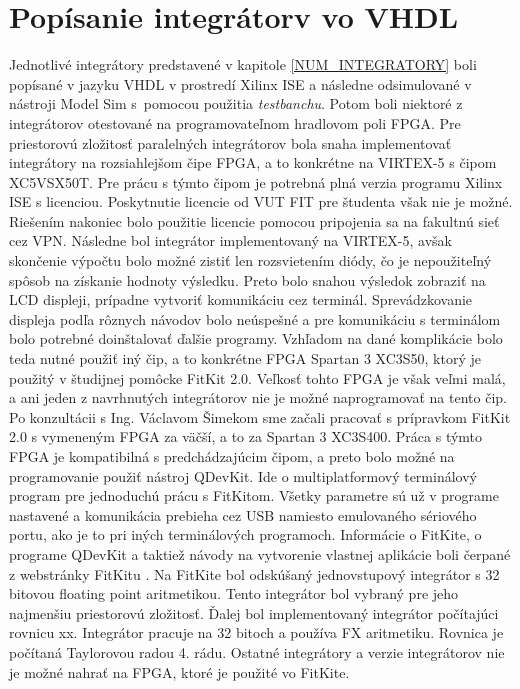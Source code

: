 \chapter{Popísanie integrátorv vo VHDL}
Jednotlivé integrátory predstavené v kapitole \ref{NUM_INTEGRATORY} boli popísané v jazyku VHDL v prostredí Xilinx ISE a následne odsimulované v nástroji Model Sim s pomocou použitia \textit{testbanchu}. Potom boli niektoré z integrátorov otestované na programovateľnom hradlovom poli FPGA.
Pre priestorovú zložitosť paralelných integrátorov bola snaha implementovať integrátory na rozsiahlejšom čipe FPGA, a to konkrétne na VIRTEX-5 s čipom XC5VSX50T. Pre prácu s týmto čipom je potrebná plná verzia programu Xilinx ISE s licenciou. Poskytnutie licencie od VUT FIT pre študenta však nie je možné. Riešením nakoniec bolo použitie licencie pomocou pripojenia sa na fakultnú sieť cez VPN. Následne bol integrátor implementovaný na VIRTEX-5, avšak skončenie výpočtu bolo možné zistiť len rozsvietením diódy, čo je nepoužiteľný spôsob na získanie hodnoty výsledku. Preto bolo snahou výsledok zobraziť na LCD displeji, prípadne vytvoriť komunikáciu cez terminál. Sprevádzkovanie displeja podľa rôznych návodov bolo neúspešné a pre komunikáciu s terminálom bolo potrebné doinštalovať ďalšie programy. Vzhľadom na dané komplikácie bolo teda nutné použiť iný čip, a to konkrétne FPGA Spartan 3 XC3S50, ktorý je použitý v študijnej pomôcke FitKit 2.0. Veľkosť tohto FPGA je však veľmi malá, a ani jeden z navrhnutých integrátorov nie je možné naprogramovať na tento čip. Po konzultácii s Ing. Václavom Šimekom sme začali pracovať s prípravkom FitKit 2.0 s vymeneným FPGA za väčší, a to za Spartan 3 XC3S400. Práca s týmto FPGA je kompatibilná s predchádzajúcim čipom, a preto bolo možné na programovanie použiť nástroj QDevKit. Ide o multiplatformový terminálový program pre jednoduchú prácu s FitKitom. Všetky parametre sú už v programe nastavené a komunikácia prebieha cez USB namiesto emulovaného sériového portu, ako je to pri iných terminálových programoch. Informácie o FitKite, o programe QDevKit a taktiež návody na vytvorenie vlastnej aplikácie boli čerpané z webstránky FitKitu \cite{fitkit}.
Na FitKite bol odskúšaný jednovstupový integrátor s 32 bitovou floating point aritmetikou. Tento integrátor bol vybraný pre jeho najmenšiu priestorovú zložitosť. Ďalej bol implementovaný integrátor počítajúci rovnicu xx. Integrátor pracuje na 32 bitoch a používa FX aritmetiku. Rovnica je počítaná Taylorovou radou 4. rádu. Ostatné integrátory a verzie integrátorov nie je možné nahrať na FPGA, ktoré je použité vo FitKite.

